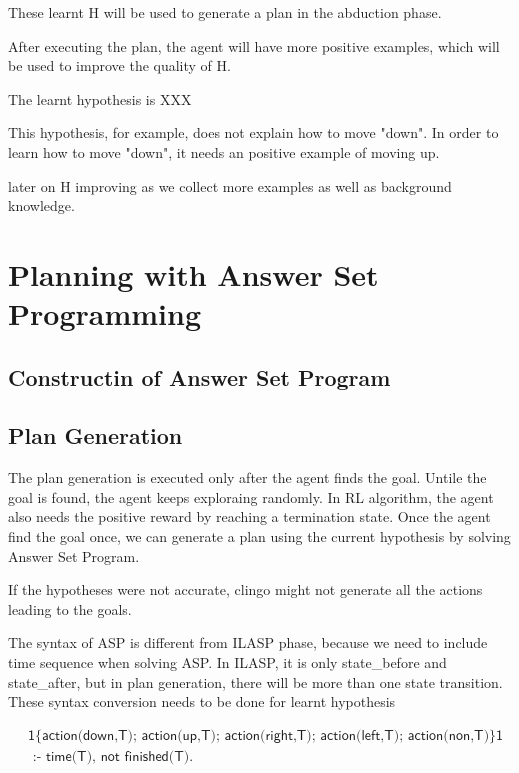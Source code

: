These learnt H will be used to generate a plan in the abduction phase.

After executing the plan, the agent will have more positive examples, which will be used to improve the quality of H.

The learnt hypothesis is XXX

This hypothesis, for example, does not explain how to move "down". In order to learn how to move "down", it needs an positive example of moving up.

later on H improving as we collect more examples as well as background knowledge.

\section{Planning with Answer Set Programming}
\label{sec:planning}

\subsection{Constructin of Answer Set Program}
\label{subsec:construction_asp}

\subsection{Plan Generation}
\label{Plan_generation}

The plan generation is executed only after the agent finds the goal. Untile the goal is found, the agent keeps exploraing randomly.
In RL algorithm, the agent also needs the positive reward by reaching a termination state. 
Once the agent find the goal once, we can generate a plan using the current hypothesis by solving Answer Set Program.

If the hypotheses were not accurate, clingo might not generate all the actions leading to the goals.

The syntax of ASP is different from ILASP phase, because we need to include time sequence when solving ASP.
In ILASP, it is only state\_before and state\_after, but in plan generation, there will be more than one state transition.
These syntax conversion needs to be done for learnt hypothesis

\begin{equation}
\begin{split}
&\textsf{1\{action(down,T); action(up,T); action(right,T); action(left,T); action(non,T)\}1} \\
&\textsf{ :- time(T), not finished(T).}\\
\end{split}
\end{equation}

